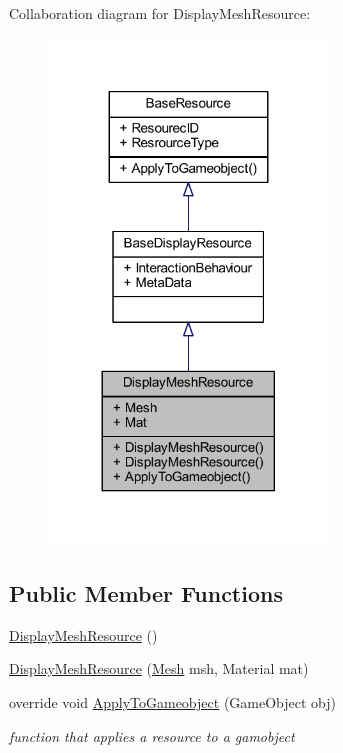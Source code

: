 Collaboration diagram for Display\+Mesh\+Resource\+:
\nopagebreak
\begin{figure}[H]
\begin{center}
\leavevmode
\includegraphics[width=209pt]{class_display_mesh_resource__coll__graph}
\end{center}
\end{figure}
\subsection*{Public Member Functions}
\begin{DoxyCompactItemize}
\item 
\mbox{\hyperlink{class_display_mesh_resource_ab51d570e0165de27fc603b69ae026e6b}{Display\+Mesh\+Resource}} ()
\item 
\mbox{\hyperlink{class_display_mesh_resource_aa4b6bc70724de2c056737f015cad4a41}{Display\+Mesh\+Resource}} (\mbox{\hyperlink{class_display_mesh_resource_a3ea74e82fc6354c0d84ed87b996e64d9}{Mesh}} msh, Material mat)
\item 
override void \mbox{\hyperlink{class_display_mesh_resource_a62672f28a402bebeed1cb79fcca81828}{Apply\+To\+Gameobject}} (Game\+Object obj)
\begin{DoxyCompactList}\small\item\em function that applies a resource to a gamobject \end{DoxyCompactList}\end{DoxyCompactItemize}

